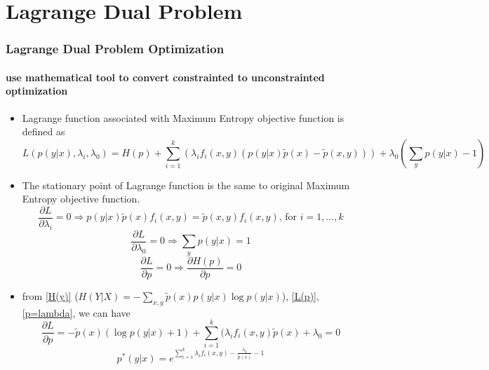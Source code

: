\section{Lagrange Dual Problem}
\begin{frame}
\frametitle{Lagrange Dual Problem Optimization}
\framesubtitle{use mathematical tool to convert constrainted to unconstrainted optimization}
	\begin{scriptsize}
		\begin{itemize}
			\item Lagrange function associated with Maximum Entropy objective function is defined as
			\begin{equation}\label{L(p)}
				L(p(y|x),\lambda_i,\lambda_0)=H(p)+\sum_{i=1}^{k}(\lambda_if_i(x,y)(p(y|x)\widetilde{p}({x})-\widetilde{p}(x,y)))+\lambda_0(\sum_{y}p(y|x)-1)
			\end{equation}
			\item The stationary point of Lagrange function is the same to original Maximum Entropy objective function.
			\begin{equation}
				\frac{\partial{L}}{\partial{\lambda_i}}=0 \Rightarrow 
				p(y|x)\widetilde{p}({x})f_i(x,y)=\widetilde{p}(x,y)f_i(x,y)\text{, for } i=1,...,k
			\end{equation}  
			\begin{equation}
				\frac{\partial{L}}{\partial{\lambda_0}}=0 \Rightarrow
				\sum_{y}p(y|x)=1
			\end{equation}
			\begin{equation}\label{p=lambda}
				\frac{\partial{L}}{\partial{p}}=0 \Rightarrow \frac{\partial{H(p)}}{\partial{p}}=0
			\end{equation}
			\item from \ref{H(y)} ($H(Y|X)=-\sum_{x,y}\widetilde{p}(x)p(y|x)\log p(y|x)$), \ref{L(p)}, \ref{p=lambda}, we can have
			\begin{equation}
				\frac{\partial{L}}{\partial{p}}=-\widetilde{p}(x)(\log p(y|x) + 1)+\sum_{i=1}^{k}(\lambda_if_i(x,y)\widetilde{p}({x})+\lambda_0=0
			\end{equation}
			\begin{equation}
				p^*(y|x)=e^{\sum_{i=1}^{k}\lambda_if_i(x,y)-\frac{\lambda_0}{\widetilde{p}(x)}-1}
			\end{equation}
		\end{itemize}
	\end{scriptsize}
\end{frame}
